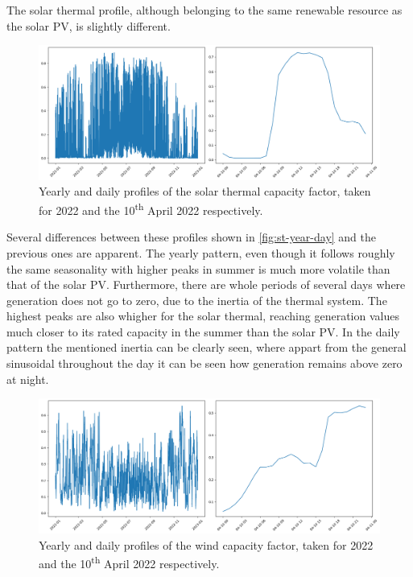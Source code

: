 The solar thermal profile, although belonging to the same renewable resource as the solar PV, is slightly different. 
\begin{figure}[ht]
    \centering
    \captionsetup{justification=centering}
    \includegraphics[width=\linewidth]{assets/st-year-day.png}
    \caption{Yearly and daily profiles of the solar thermal capacity factor, taken for 2022 and the 10\textsuperscript{th} April 2022 respectively.}
    \label{fig:st-year-day}
\end{figure}

Several differences between these profiles shown in \autoref{fig:st-year-day} and the previous ones are apparent. The yearly pattern, even though it follows roughly the same seasonality with higher peaks in summer is much more volatile than that of the solar PV. Furthermore, there are whole periods of several days where generation does not go to zero, due to the inertia of the thermal system. The highest peaks are also whigher for the solar thermal, reaching generation values much closer to its rated capacity in the summer than the solar PV. In the daily pattern the mentioned inertia can be clearly seen, where appart from the general sinusoidal throughout the day it can be seen how generation remains above zero at night.

\begin{figure}[ht]
    \centering
    \captionsetup{justification=centering}
    \includegraphics[width=\linewidth]{assets/w-year-day.png}
    \caption{Yearly and daily profiles of the wind capacity factor, taken for 2022 and the 10\textsuperscript{th} April 2022 respectively.}
    \label{fig:w-year-day}
\end{figure}

